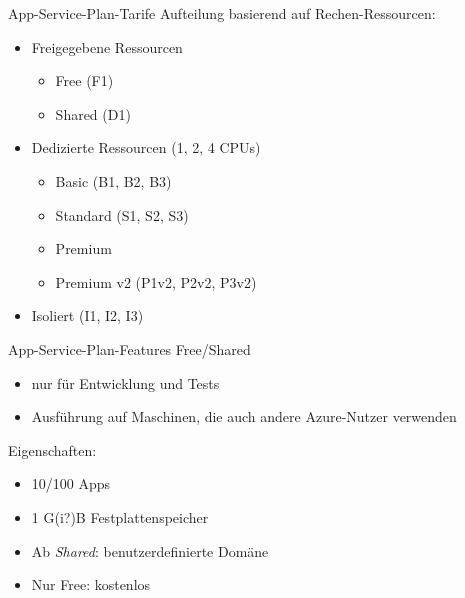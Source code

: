 \begin{flashcard}[Definition]{App-Service-Plan-Tarife}
    Aufteilung basierend auf Rechen-Ressourcen:
    \begin{itemize}
        \item Freigegebene Ressourcen
            \begin{itemize}
                \item Free (F1)
                \item Shared (D1)
            \end{itemize}
        \item Dedizierte Ressourcen (1, 2, 4 CPUs)
            \begin{itemize}
                \item Basic (B1, B2, B3)
                \item Standard (S1, S2, S3)
                \item Premium
                \item Premium v2 (P1v2, P2v2, P3v2)
            \end{itemize}
        \item Isoliert (I1, I2, I3)
    \end{itemize}
\end{flashcard}

\begin{flashcard}[Definition]{App-Service-Plan-Features Free/Shared}
    \begin{itemize}
        \item nur für Entwicklung und Tests
        \item Ausführung auf Maschinen, die auch andere Azure-Nutzer verwenden
    \end{itemize}
    Eigenschaften:
    \begin{itemize}
        \item 10/100 Apps
        \item 1 G(i?)B Festplattenspeicher
        \item Ab \emph{Shared}: benutzerdefinierte Domäne
        \item Nur Free: kostenlos
    \end{itemize}
\end{flashcard}

